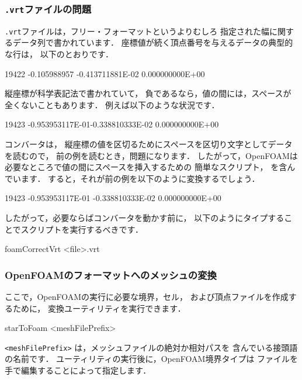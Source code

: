 \subsubsection{\texttt{.vrt}ファイルの問題}
\label{sssec:5.5.2.6}
\texttt{.vrt}ファイルは，フリー・フォーマットというよりむしろ
指定された幅に関するデータ列で書かれています．
座標値が続く頂点番号を与えるデータの典型的な行は，
以下のとおりです．
\begin{OFverbatim}[file]
19422 -0.105988957 -0.413711881E-02 0.000000000E+00
\end{OFverbatim}
縦座標が科学表記法で書かれていて，
負であるなら，値の間には，スペースが全くないこともあります．
例えば以下のような状況です．
\begin{OFverbatim}[file]
19423 -0.953953117E-01-0.338810333E-02 0.000000000E+00
\end{OFverbatim}
コンバータは，
縦座標の値を区切るためにスペースを区切り文字としてデータを読むので，
前の例を読むとき，問題になります．
したがって，OpenFOAMは必要なところで値の間にスペースを挿入するための
簡単なスクリプト，
%
%
を含んでいます．
すると，それが前の例を以下のように変換するでしょう．
\begin{OFverbatim}[file]
19423 -0.953953117E-01 -0.338810333E-02 0.000000000E+00
\end{OFverbatim}
したがって，必要ならばコンバータを動かす前に，
以下のようにタイプすることでスクリプトを実行するべきです．
\begin{OFverbatim}[terminal]
foamCorrectVrt <file>.vrt
\end{OFverbatim}

\subsubsection{OpenFOAMのフォーマットへのメッシュの変換}
\label{sssec:5.5.2.7}
ここで，OpenFOAMの実行に必要な境界，セル，
および頂点ファイルを作成するために，
変換ユーティリティを実行できます．
\begin{OFverbatim}[terminal]
starToFoam <meshFilePrefix>
\end{OFverbatim}
\texttt{<meshFilePrefix>} は，メッシュファイルの絶対か相対パスを
含んでいる接頭語の名前です．
ユーティリティの実行後に，OpenFOAM境界タイプは
ファイルを手で編集することによって指定します．


